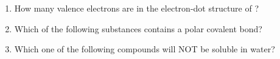 \documentclass[main.tex]{subfiles}
\begin{document}
\pagestyle{style4}
\setlength{\parskip}{0.5em}
\begin{fullwidth}
\begin{multicols*}{2}\begin{enumerate}  \setlength\itemsep{0.2em}








\item How many valence electrons are in the electron-dot structure of ?
\begin{enumerate}[label=(\alph*)]\vspace{-0.5cm}
\end{enumerate}\vspace{-0.5cm}



\item Which of the following substances contains a polar covalent bond?
\begin{enumerate}[label=(\alph*)]\vspace{-0.5cm}
\end{enumerate}\vspace{-0.5cm}

\item Which one of the following compounds will NOT be soluble in water?
\begin{enumerate}[label=(\alph*)]\vspace{-0.5cm}
\end{enumerate}\vspace{-0.5cm}


\end{enumerate}
\end{multicols*}
\end{fullwidth}
\end{document}
